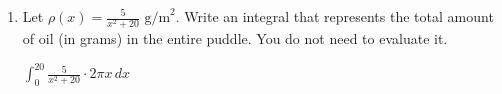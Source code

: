 \documentclass{article}
\begin{document}
\begin{enumerate}
\begin{enumerate}
 \begin{solution}
 The amount of oil in the $k$th circular ring will be the density $\rho(x_k)$ times the area $2\pi x_k\Delta x$, so the correct sum is 
 \end{solution}

 \item 
 \begin{problem}
 Let $\displaystyle \rho(x) = \frac{5}{x^2 + 20} \text{ g/m}^2$. Write an integral that represents the total amount of oil (in grams) in the entire puddle. You do not need to evaluate it.
 \end{problem}
 \pspace{\vfill}

 \begin{solution}
     $\displaystyle \int_0^{20} \frac{5}{x^2+20}\cdot 2\pi x\,dx$
 \end{solution}

 \end{enumerate}

 






\end{enumerate}
\end{document}
